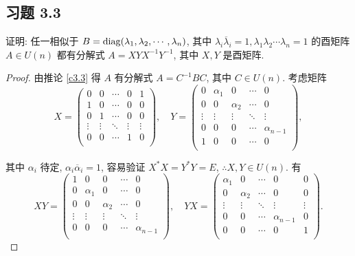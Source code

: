\documentclass{ctexart}
\begin{document}
\subsection{习题 3.3}
\begin{exercise}%
    证明: 任一相似于 $B=\operatorname{diag} (\lambda_1,\lambda_2,\cdots,\lambda_n)$, 其中 $\lambda_i\overline{\lambda}_i=1,\lambda_1\lambda_2\cdots\lambda_n=1$ 的酉矩阵 $A\in U(n)$ 都有分解式 $A=XYX^{-1}Y^{-1}$, 其中 $X,Y$ 是酉矩阵.
\end{exercise}
\begin{proof}
    由推论 \ref{c3.3} 得 $A$ 有分解式 $A=C^{-1}BC$, 其中 $C\in U(n)$. 考虑矩阵
    \[X=\begin{pmatrix}
        0 & 0 & \cdots & 0 & 1 \\
        1 & 0 & \cdots & 0 & 0 \\
        0 & 1 & \cdots & 0 & 0 \\
        \vdots & \vdots & \ddots & \vdots & \vdots \\
        0 & 0 & \cdots & 1 & 0 \\
    \end{pmatrix},\quad Y=\begin{pmatrix}
        0 & \alpha_1 & 0 & \cdots & 0 \\
        0 & 0 & \alpha_2 & \cdots & 0 \\
        \vdots & \vdots & \vdots & \ddots & \vdots \\
        0 & 0 & 0 & \cdots & \alpha_{n-1} \\
        1 & 0 & 0 & \cdots & 0 \\
    \end{pmatrix},\]

    其中 $\alpha_i$ 待定, $\alpha_i\overline{\alpha}_i=1$, 容易验证 $X^*X=Y^*Y=E$, $\therefore X,Y\in U(n)$. 有
    \[XY=\begin{pmatrix}
        1 & 0 & 0 & \cdots & 0 \\
        0 & \alpha_1 & 0 & \cdots & 0 \\
        0 & 0 & \alpha_2 & \cdots & 0 \\
        \vdots & \vdots & \vdots & \ddots & \vdots \\
        0 & 0 & 0 & \cdots & \alpha_{n-1} \\
    \end{pmatrix},\quad YX=\begin{pmatrix}
        \alpha_1 & 0 & \cdots & 0 & 0 \\
        0 & \alpha_2 & \cdots & 0 & 0 \\
        \vdots & \vdots & \ddots & \vdots & \vdots \\
        0 & 0 & \cdots & \alpha_{n-1} & 0 \\
        0 & 0 & \cdots & 0 & 1 \\
    \end{pmatrix}.\]


\end{proof}
\end{document}
